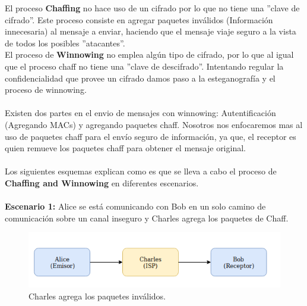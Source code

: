 \documentclass[12pt, a4paper, titlepage]{report}
\begin{document}
        El proceso \textbf{Chaffing} no hace uso de un cifrado por lo que no tiene una ''clave de cifrado''. Este proceso consiste en agregar paquetes inv\'alidos (Informaci\'on innecesaria) al mensaje a enviar, haciendo que el mensaje viaje seguro a la vista de todos los posibles ''atacantes''.\\
        El proceso de \textbf{Winnowing} no emplea alg\'un tipo de cifrado, por lo que al igual que el proceso chaff no tiene una ''clave de descifrado''. Intentando regular la confidencialidad que provee un cifrado damos paso a la esteganograf\'ia y el proceso de winnowing.\cite{refRivestMIT}
        
        \paragraph{}
        Existen dos partes en el envio de mensajes con winnowing: Autentificaci\'on (Agregando MACs) y agregando paquetes chaff. Nosotros nos enfocaremos mas al uso de paquetes chaff para el env\'io seguro de informaci\'on, ya que, el receptor es quien remueve los paquetes chaff para obtener el mensaje original. 
        
        \paragraph{}
        Los siguientes esquemas explican como es que se lleva a cabo el proceso de \textbf{Chaffing and Winnowing} en diferentes escenarios.
        
		\paragraph{}
		\textbf{Escenario 1:} Alice se est\'a comunicando con Bob en un solo camino de comunicación sobre un canal inseguro y Charles agrega los paquetes de Chaff.\\
		\begin{figure}[!htb]
			\begin{center}	                  \includegraphics[width=14cm]{./imagenes/MarcoTeorico/chaffProcess.png}
				\caption{Charles agrega los paquetes inválidos.}
			\end{center}
		\end{figure}
		
\end{document}
